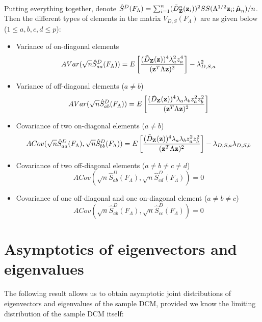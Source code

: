 \documentclass[fleqn,11pt]{article}
\begin{document}
\paragraph{}Putting everything together, denote $\hat S^D(F_\Lambda) = \sum_{i=1}^n (\tilde D^n_{\mathbf{Z}} ({\bf{z}}_i))^2 SS(\Lambda^{1/2}{\bf{z}}_i; \hat {{\boldsymbol{\mu}}}_n)/n $. Then the different types of elements in the matrix $V_{D,S}(F_\Lambda)$ are as given below ($1 \leq a,b,c,d \leq p$):

\begin{itemize}
\item Variance of on-diagonal elements
%
$$ AVar( \sqrt n \hat S^D_{aa} (F_\Lambda)) = E \left[ \frac{(\tilde D_{\mathbf{Z}} ({\bf{z}}))^4 \lambda_a^2 z_a^4}{({\bf{z}}^T \Lambda {\bf{z}})^2} \right] - \lambda_{D,S,a}^2 $$

\item Variance of off-diagonal elements ($a \neq b$)
%
$$ AVar( \sqrt n \hat S^D_{ab} (F_\Lambda)) = E \left[ \frac{(\tilde D_{\mathbf{Z}} ({\bf{z}}))^4 \lambda_a \lambda_b z_a^2 z_b^2}{({\bf{z}}^T \Lambda {\bf{z}})^2} \right] $$

\item Covariance of two on-diagonal elements ($a \neq b$)
%
$$ ACov(\sqrt n \hat S^D_{aa} (F_\Lambda), \sqrt n \hat S^D_{bb} (F_\Lambda))
= E \left[ \frac{(\tilde D_{\mathbf{Z}} ({\bf{z}}))^4 \lambda_a \lambda_b z_a^2 z_b^2}{({\bf{z}}^T \Lambda {\bf{z}})^2} \right] - \lambda_{D,S,a} \lambda_{D,S,b} $$

\item Covariance of two off-diagonal elements ($a \neq b \neq c \neq d$)
%
$$ ACov(\sqrt n \hat S^D_{ab} (F_\Lambda), \sqrt n \hat S^D_{cd} (F_\Lambda)) = 0 $$

\item Covariance of one off-diagonal and one on-diagonal element ($a \neq b \neq c$)
%
$$ ACov(\sqrt n \hat S^D_{ab} (F_\Lambda), \sqrt n \hat S^D_{cc} (F_\Lambda)) = 0 $$
\end{itemize}

\section{Asymptotics of eigenvectors and eigenvalues}\label{section:appB}
The following result allows us to obtain asymptotic joint distributions of eigenvectors and eigenvalues of the sample DCM, provided we know the limiting distribution of the sample DCM itself:
\end{document}
